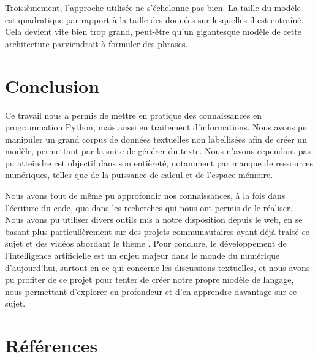 \documentclass[12pt]{article}
\begin{document}
Troisièmement, l'approche utilisée ne s'échelonne pas bien. La taille du modèle est quadratique par rapport à la taille des données sur lesquelles il est entraîné. Cela devient vite bien trop grand, peut-être qu'un gigantesque modèle de cette architecture parviendrait à formuler des phrases.


\section{Conclusion}

Ce travail nous a permis de mettre en pratique des connaissances en programmation Python, mais aussi en traitement d'informations. Nous avons pu manipuler un grand corpus de données textuelles non labellisées afin de créer un modèle, permettant par la suite de générer du texte. Nous n'avons cependant pas pu atteindre cet objectif dans son entièreté, notamment par manque de ressources numériques, telles que de la puissance de calcul et de l'espace mémoire.

Nous avons tout de même pu approfondir nos connaissances, à la fois dans l'écriture du code, que dans les recherches qui nous ont permis de le réaliser. Nous avons pu utiliser divers outils mis à notre disposition depuis le web, en se basant plus particulièrement sur des projets communautaires ayant déjà traité ce sujet et des vidéos abordant le thème \cite{karpathy2021lets}. Pour conclure, le développement de l'intelligence artificielle est un enjeu majeur dans le monde du numérique d'aujourd'hui, surtout en ce qui concerne les discussions textuelles, et nous avons pu profiter de ce projet pour tenter de créer notre propre modèle de langage, nous permettant d'explorer en profondeur et d'en apprendre davantage sur ce sujet.\\

\section{Références}


\end{document}
